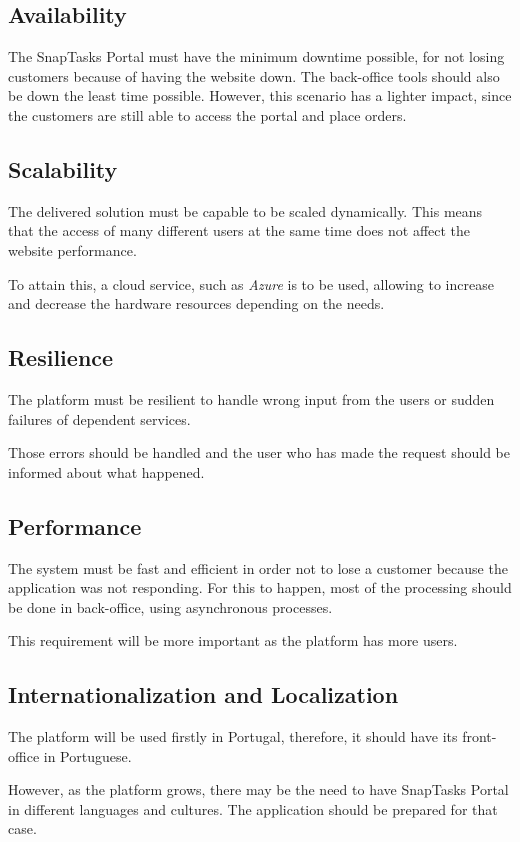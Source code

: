 \subsection{Availability}
The SnapTasks Portal must have the minimum downtime possible, for not losing customers because of having the website down.
The back-office tools should also be down the least time possible. However, this scenario has a lighter impact, since the customers are still able to access the portal and place orders.

\subsection{Scalability}
The delivered solution must be capable to be scaled dynamically. This means that the access of many different users at the same time does not affect the website performance. 
\par
To attain this, a cloud service, such as \textit{Azure} is to be used, allowing to increase and decrease the hardware resources depending on the needs.

\subsection{Resilience}
The platform must be resilient to handle wrong input from the users or sudden failures of dependent services. 
\par 
Those errors should be handled and the user who has made the request should be informed about what happened. 

\subsection{Performance}
The system must be fast and efficient in order not to lose a customer because the application was not responding. For this to happen, most of the processing should be done in back-office, using asynchronous processes.
\par
This requirement will be more important as the platform has more users. 

\par

\subsection{Internationalization and Localization}
The platform will be used firstly in Portugal, therefore, it should have its front-office in Portuguese.
\par
However, as the platform grows, there may be the need to have SnapTasks Portal in different languages and cultures. The application should be prepared for that case.

